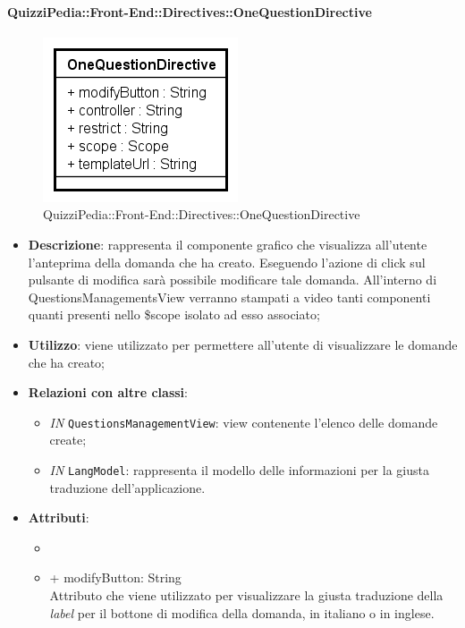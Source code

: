 \paragraph{QuizziPedia::Front-End::Directives::OneQuestionDirective}

\label{QuizziPedia::Front-End::Directives::OneQuestionDirective}

\begin{figure}[ht]
	\centering
	\includegraphics[scale=0.80,keepaspectratio]{UML/Classi/Front-End/QuizziPedia_Front-end_Directives_OneQuestionDirective.png}
	\caption{QuizziPedia::Front-End::Directives::OneQuestionDirective}
\end{figure} 
\FloatBarrier

\begin{itemize}
	\item \textbf{Descrizione}: rappresenta il componente grafico che visualizza all'utente l'anteprima della domanda che ha creato. Eseguendo l'azione di click sul pulsante di modifica sarà possibile modificare tale domanda. All'interno di QuestionsManagementsView verranno stampati a video tanti componenti quanti presenti nello \$scope isolato ad esso associato;
	\item \textbf{Utilizzo}: viene utilizzato per permettere all'utente di visualizzare le domande che ha creato;
	\item \textbf{Relazioni con altre classi}: 
	\begin{itemize}
		\item \textit{IN} \texttt{QuestionsManagementView}: view contenente l'elenco delle domande create;
		\item \textit{IN} \texttt{LangModel}: rappresenta il modello delle informazioni per la giusta traduzione dell'applicazione. 
	\end{itemize}
	\item \textbf{Attributi}: 
	\begin{itemize}
		\item \item {+ modifyButton: String} \\ Attributo che viene utilizzato per visualizzare la giusta traduzione della \textit{label} per il bottone di modifica della domanda, in italiano o in inglese.
	\end{itemize}
\end{itemize}

